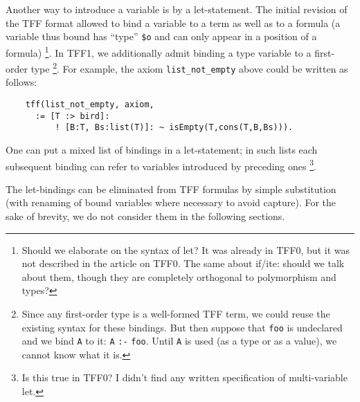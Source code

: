 Another way to introduce a variable is by a let-statement.
The initial revision of the TFF format allowed to bind a variable
to a term as well as to a formula (a variable thus bound has
``type'' \verb+$o+ and can only appear in a position of a formula)%
\footnote{Should we elaborate on the syntax of let?
It was already in TFF0, but it was not described in
the article on TFF0. The same about if/ite: should
we talk about them, though they are completely
orthogonal to polymorphism and types?}.
In TFF1, we additionally admit binding a type variable
to a first-order type%
\footnote{Since any first-order type is a well-formed TFF term,
we could reuse the existing syntax for these bindings.
But then suppose that {\tt foo} is undeclared and
we bind {\tt A} to it: {\tt A} {\tt :-} {\tt foo}.
Until {\tt A} is used
(as a type or as a value), we cannot know what it is.}.
For example,
the axiom \verb+list_not_empty+ above could be written as
follows:
\begin{verbatim}
    tff(list_not_empty, axiom,
      := [T :> bird]:
          ! [B:T, Bs:list(T)]: ~ isEmpty(T,cons(T,B,Bs))).
\end{verbatim}
One can put a mixed list of bindings in a let-statement;
in such lists each subsequent binding can refer
to variables introduced by preceding ones%
\footnote{Is this true in TFF0? I didn't find any written
specification of multi-variable let.}.

The let-bindings can be eliminated from TFF formulas by simple
substitution (with renaming of bound variables where necessary
to avoid capture). For the sake of brevity, we do not consider
them in the following sections.

